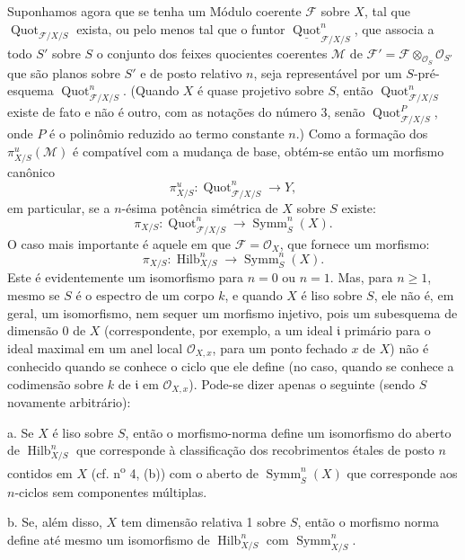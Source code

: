Suponhamos agora que se tenha um Módulo coerente $\mathcal F$ sobre $X$, tal
que $\operatorname{Quot}_{\mathcal F/X/S}$ exista, ou pelo menos tal que o
funtor $\underline{\operatorname{Quot}}^n_{\mathcal F/X/S}$, que associa a
todo $S'$ sobre $S$ o conjunto dos feixes quocientes coerentes $\mathcal M$ de
$\mathcal F'=\mathcal F\otimes_{\mathcal O_S}\mathcal O_{S'}$ que são planos
sobre $S'$ e de posto relativo $n$, seja representável por um $S$-pré-esquema
$\operatorname{Quot}^n_{\mathcal F/X/S}$. (Quando $X$ é quase projetivo sobre
$S$, então $\operatorname{Quot}^n_{\mathcal F/X/S}$ existe de fato e não é
outro, com as notações do número 3, senão
$\operatorname{Quot}^P_{\mathcal F/X/S}$, onde $P$ é o polinômio reduzido ao
termo constante $n$.) Como a formação dos $\pi^u_{X/S}(\mathcal M)$ é
compatível com a mudança de base, obtém-se então um morfismo canônico
\[
\pi^u_{X/S}:\operatorname{Quot}^n_{\mathcal F/X/S}\longrightarrow Y,
\]
em particular, se a $n$-ésima potência simétrica de $X$ sobre $S$ existe:
\[
\pi_{X/S}:\operatorname{Quot}^n_{\mathcal F/X/S}
\longrightarrow\operatorname{Symm}^n_S(X).
\]
O caso mais importante é aquele em que $\mathcal F=\mathcal O_X$, que fornece
um morfismo:
\[
\pi_{X/S}:\operatorname{Hilb}^n_{X/S}
\longrightarrow\operatorname{Symm}^n_S(X).
\]
Este é evidentemente um isomorfismo para $n=0$ ou $n=1$. Mas, para
$n\geq1$, mesmo se $S$ é o espectro
de um corpo $k$, e quando $X$ é liso sobre $S$, ele não é, em geral, um
isomorfismo, nem sequer um morfismo injetivo, pois um subesquema de dimensão 0
de $X$ (correspondente, por exemplo, a um ideal $\mathfrak i$ primário para o
ideal maximal em um anel local $\mathcal O_{X,x}$, para um ponto fechado $x$ de
$X$) não é conhecido quando se conhece o ciclo que ele define (no caso, quando
se conhece a codimensão sobre $k$ de $\mathfrak i$ em $\mathcal O_{X,x}$).
Pode-se dizer apenas o seguinte (sendo $S$ novamente arbitrário):

\medskip
\noindent a. Se $X$ é liso sobre $S$, então o morfismo-norma define um
isomorfismo do aberto de $\operatorname{Hilb}^n_{X/S}$ que corresponde à
classificação dos recobrimentos étales de posto $n$ contidos em $X$ (cf.
n\textsuperscript{o} 4, (b)) com o aberto de
$\operatorname{Symm}^n_S(X)$ que corresponde aos $n$-ciclos sem componentes
múltiplas.

\medskip
\noindent b. Se, além disso, $X$ tem dimensão relativa 1 sobre $S$, então o
morfismo norma define até mesmo um isomorfismo de
$\operatorname{Hilb}^n_{X/S}$ com $\operatorname{Symm}^n_{X/S}$.

